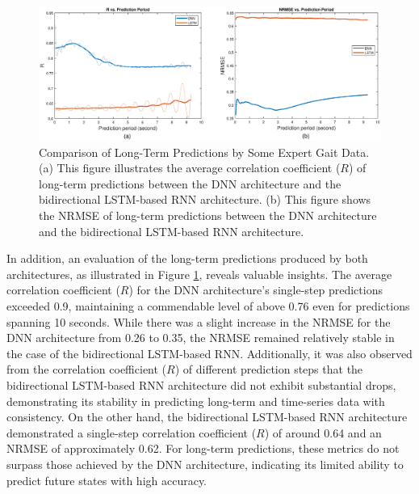 \begin{figure}[htb]
    \centering
    \includegraphics[width=\linewidth]{img/chap4/long2net.eps}
    \caption{Comparison of Long-Term Predictions by Some Expert Gait Data. (a) This figure illustrates the average correlation coefficient ($R$) of long-term predictions between the DNN architecture and the bidirectional LSTM-based RNN architecture. (b) This figure shows the \ac{NRMSE} of long-term predictions between the DNN architecture and the bidirectional LSTM-based RNN architecture.}
    \label{fig:comp2net}
\end{figure}

In addition, an evaluation of the long-term predictions produced by both architectures, as illustrated in Figure \ref{fig:comp2net}, reveals valuable insights. The average correlation coefficient ($R$) for the DNN architecture's single-step predictions exceeded 0.9, maintaining a commendable level of above 0.76 even for predictions spanning 10 seconds. While there was a slight increase in the \ac{NRMSE} for the DNN architecture from 0.26 to 0.35, the \ac{NRMSE} remained relatively stable in the case of the bidirectional LSTM-based RNN. Additionally, it was also observed from the correlation coefficient ($R$) of different prediction steps that the bidirectional LSTM-based RNN architecture did not exhibit substantial drops, demonstrating its stability in predicting long-term and time-series data with consistency. On the other hand, the bidirectional LSTM-based RNN architecture demonstrated a single-step correlation coefficient ($R$) of around 0.64 and an \ac{NRMSE} of approximately 0.62. For long-term predictions, these metrics do not surpass those achieved by the DNN architecture, indicating its limited ability to predict future states with high accuracy. 

